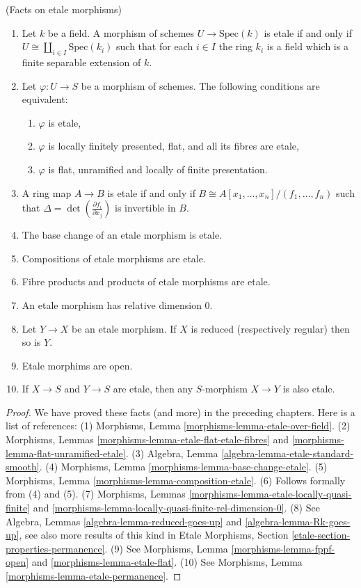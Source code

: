\begin{proposition}
\label{proposition-etale-morphisms}
(Facts on etale morphisms)
\begin{enumerate}
\item Let $k$ be a field. A morphism of schemes $U \to \text{Spec}(k)$ is
etale if and only if $U \cong \coprod_{i \in I} \text{Spec}(k_i)$
such that for each $i \in I$
the ring $k_i$ is a field which is a finite separable extension of $k$.
\item Let $\varphi : U \to S$ be a morphism of schemes. The following
conditions are equivalent:
\begin{enumerate}
\item $\varphi$ is etale,
\item $\varphi$ is locally finitely presented, flat, and all its fibres are
etale,
\item $\varphi$ is flat, unramified and locally of finite presentation.
\end{enumerate}
\item A ring map $A \to B$ is etale if and only if
$B \cong A[x_1, \dots, x_n]/(f_1,\dots,f_n)$
such that $\Delta = \det \left( \frac{\partial f_i}{\partial x_j} \right)$
is invertible in $B$.
\item The base change of an etale morphism is etale.
\item Compositions of etale morphisms are etale.
\item Fibre products and products of etale morphisms are etale.
\item An etale morphism has relative dimension 0.
\item Let $Y \to X$ be an etale morphism.
If $X$ is reduced (respectively regular) then so is $Y$.
\item Etale morphims are open.
\item If $X \to S$ and $Y \to S$ are etale, then any
$S$-morphism $X \to Y$ is also etale.
\end{enumerate}
\end{proposition}

\begin{proof}
We have proved these facts (and more) in the preceding chapters.
Here is a list of references:
(1) Morphisms, Lemma \ref{morphisms-lemma-etale-over-field}.
(2) Morphisms, Lemmas \ref{morphisms-lemma-etale-flat-etale-fibres}
and \ref{morphisms-lemma-flat-unramified-etale}.
(3) Algebra, Lemma \ref{algebra-lemma-etale-standard-smooth}.
(4) Morphisms, Lemma \ref{morphisms-lemma-base-change-etale}.
(5) Morphisms, Lemma \ref{morphisms-lemma-composition-etale}.
(6) Follows formally from (4) and (5).
(7) Morphisms, Lemmas \ref{morphisms-lemma-etale-locally-quasi-finite}
and \ref{morphisms-lemma-locally-quasi-finite-rel-dimension-0}.
(8) See Algebra, Lemmas \ref{algebra-lemma-reduced-goes-up} and
\ref{algebra-lemma-Rk-goes-up}, see also more results of this kind
in Etale Morphisms, Section \ref{etale-section-properties-permanence}.
(9) See Morphisms, Lemma \ref{morphisms-lemma-fppf-open} and
\ref{morphisms-lemma-etale-flat}.
(10) See Morphisms, Lemma \ref{morphisms-lemma-etale-permanence}.
\end{proof}

